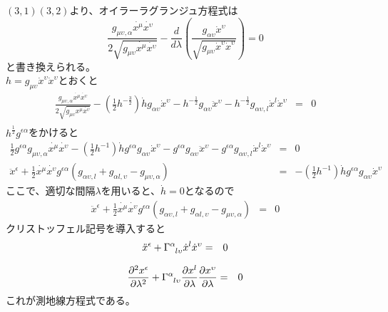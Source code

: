 \documentclass[dvipdfmx]{report} %
\begin{document}
$(3,1)$$(3,2)$より、オイラーラグランジュ方程式は
$$
 \frac{ g_{\mu \upsilon , \alpha} \dot{x^\mu} \dot{x^\upsilon} }{ 2\sqrt{ g_{\mu \upsilon} \dot{x^\mu} \dot{x^\upsilon} } } - \frac{d}{d\lambda} \left( \frac{ g_{\alpha \upsilon}\dot{x}^{\upsilon} }{ \sqrt{g_{\mu \upsilon}\dot{x}^{\upsilon}  \dot{x}^{\upsilon} } } \right) = 0
$$
と書き換えられる。\\
$h = g_{\mu \upsilon}\dot{x}^{\upsilon}  \dot{x}^{\upsilon}$とおくと
\begin{eqnarray*}
 \frac{ g_{\mu \upsilon , \alpha} \dot{x^\mu} \dot{x^\upsilon} }{ 2\sqrt{ g_{\mu \upsilon} \dot{x^\mu} \dot{x^\upsilon} } } - \left( \frac{1}{2} h^{- \frac{3}{2}} \right) \dot{h} g_{\alpha \upsilon} \dot{x}^{\upsilon} - h^{- \frac{1}{2}} g_{\alpha \upsilon} \ddot{x}^{\upsilon} - h^{- \frac{1}{2}} g_{\alpha \upsilon, l} \dot{x}^l \dot{x}^{\upsilon} &=& 0 \nonumber \\
\end{eqnarray*}
$h^{\frac{1}{2}}g^{\epsilon \alpha}$をかけると
\begin{eqnarray*}
 \frac{1}{2} g^{\epsilon \alpha} g_{\mu \upsilon , \alpha} \dot{x^\mu} \dot{x^\upsilon} - 
\left( \frac{1}{2} h^{-1} \right) \dot{h} g^{\epsilon \alpha} g_{\alpha \upsilon} \dot{x}^{\upsilon} - g^{\epsilon \alpha} g_{\alpha \upsilon} \ddot{x}^{\upsilon} - g^{\epsilon \alpha} g_{\alpha \upsilon, l} \dot{x}^l \dot{x}^{\upsilon} &=& 0 \nonumber \\
\ddot{x}^{\epsilon} + \frac{1}{2} \dot{x^\mu} \dot{x^\upsilon} g^{\epsilon \alpha} \left( g_{\alpha \upsilon, l} + g_{\alpha l, \upsilon} - g_{\mu \upsilon , \alpha} \right) &=&
- \left( \frac{1}{2} h^{-1} \right) \dot{h} g^{\epsilon \alpha} g_{\alpha \upsilon} \dot{x}^{\upsilon}
\end{eqnarray*}
ここで、適切な間隔$\lambda$を用いると、$\dot{h} = 0$となるので
\begin{eqnarray*}
\ddot{x}^{\epsilon} + \frac{1}{2} \dot{x^\mu} \dot{x^\upsilon} g^{\epsilon \alpha} \left( g_{\alpha \upsilon, l} + g_{\alpha l, \upsilon} - g_{\mu \upsilon , \alpha} \right) &=& 0
\end{eqnarray*}
クリストッフェル記号を導入すると
\begin{eqnarray*}
\ddot{x}^{\epsilon} + \tensor{\Gamma}{^{\alpha}_{l \upsilon}} \dot{x}^l \dot{x}^{\upsilon} &=& 0
\end{eqnarray*}
\begin{tcolorbox}
\begin{eqnarray*}
\frac{ \partial ^2 {x}^{\epsilon} }{ \partial \lambda^2 } + \tensor{\Gamma}{^{\alpha}_{l \upsilon}} \frac{ \partial x^l }{ \partial \lambda } \frac{ \partial x^{\upsilon} }{ \partial \lambda } &=& 0
\end{eqnarray*}
これが測地線方程式である。
\end{tcolorbox}
\end{document}

